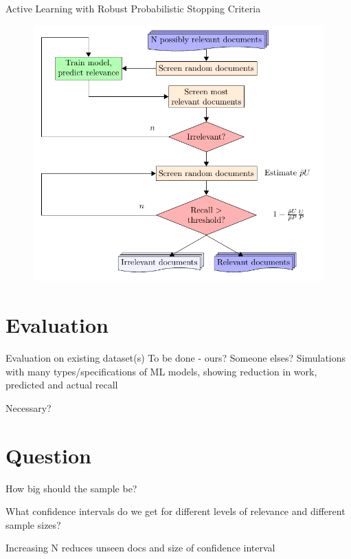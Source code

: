 \documentclass[9pt]{beamer}
\begin{document}
\begin{frame}{Active Learning with Robust Probabilistic Stopping Criteria} 

\begin{figure}
	\includegraphics[width=0.8\linewidth]{../images/flow.pdf}
\end{figure}

\end{frame}

\section{Evaluation}

\begin{frame}{Evaluation on existing dataset(s)}
To be done - ours? Someone elses? Simulations with many types/specifications of ML models, showing reduction in work, predicted and actual recall

\bigskip

Necessary?
\end{frame}

\section{Question}

\begin{frame}{How big should the sample be?}

What confidence intervals do we get for different levels of relevance and different sample sizes?

\bigskip

Increasing N reduces unseen docs and size of confidence interval

\end{frame}
\end{document}
